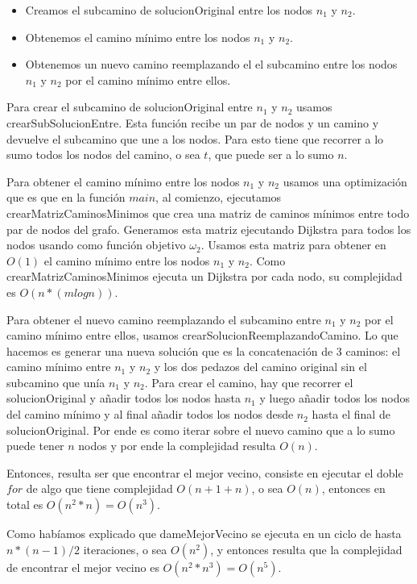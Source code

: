 \begin{itemize}
\item Creamos el subcamino de solucionOriginal entre los nodos $n_1$ y $n_2$.
\item Obtenemos el camino mínimo entre los nodos $n_1$ y $n_2$.
\item Obtenemos un nuevo camino reemplazando el el subcamino entre los nodos $n_1$ y $n_2$ por el camino mínimo entre ellos.
\end{itemize}

Para crear el subcamino de solucionOriginal entre $n_1$ y $n_2$ usamos crearSubSolucionEntre. Esta función recibe un par de nodos y un camino y devuelve el subcamino que une a los nodos. Para esto tiene que recorrer a lo sumo todos los nodos del camino, o sea $t$, que puede ser a lo sumo $n$.

Para obtener el camino mínimo entre los nodos $n_1$ y $n_2$ usamos una optimización que es que en la función $main$, al comienzo, ejecutamos crearMatrizCaminosMinimos que crea una matriz de caminos mínimos entre todo par de nodos del grafo. Generamos esta matriz ejecutando Dijkstra para todos los nodos usando como función objetivo $\omega_2$. Usamos esta matriz para obtener en $O(1)$ el camino mínimo entre los nodos $n_1$ y $n_2$.
Como crearMatrizCaminosMinimos ejecuta un Dijkstra por cada nodo, su complejidad es $O(n * (m log n))$.

Para obtener el nuevo camino reemplazando el subcamino entre $n_1$ y $n_2$ por el camino mínimo entre ellos, usamos crearSolucionReemplazandoCamino.
Lo que hacemos es generar una nueva solución que es la concatenación de 3 caminos: el camino mínimo entre $n_1$ y $n_2$ y los dos pedazos del camino original sin el subcamino que unía $n_1$ y $n_2$. Para crear el camino, hay que recorrer el solucionOriginal y añadir todos los nodos hasta $n_1$ y luego añadir todos los nodos del camino mínimo y al final añadir todos los nodos desde $n_2$ hasta el final de solucionOriginal. Por ende es como iterar sobre el nuevo camino que a lo sumo puede tener $n$ nodos y por ende la complejidad resulta $O(n)$.

Entonces, resulta ser que encontrar el mejor vecino, consiste en ejecutar el doble $for$ de algo que tiene complejidad $O(n + 1 + n)$, o sea $O(n)$, entonces en total es $O(n^2 * n) = O(n^3)$.

Como habíamos explicado que dameMejorVecino se ejecuta en un ciclo de hasta $n * (n-1) / 2$ iteraciones, o sea $O(n^2)$, y entonces resulta que la complejidad de encontrar el mejor vecino es $O(n^2 * n^3) = O(n^5)$. 

